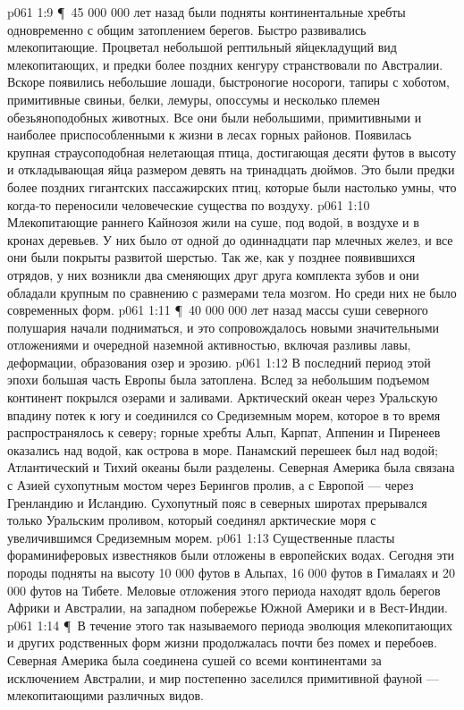 \vs p061 1:9 \P\ 45 000 000 лет назад были подняты континентальные хребты одновременно с общим затоплением берегов. Быстро развивались млекопитающие. Процветал небольшой рептильный яйцекладущий вид млекопитающих, и предки более поздних кенгуру странствовали по Австралии. Вскоре появились небольшие лошади, быстроногие носороги, тапиры с хоботом, примитивные свиньи, белки, лемуры, опоссумы и несколько племен обезьяноподобных животных. Все они были небольшими, примитивными и наиболее приспособленными к жизни в лесах горных районов. Появилась крупная страусоподобная нелетающая птица, достигающая десяти футов в высоту и откладывающая яйца размером девять на тринадцать дюймов. Это были предки более поздних гигантских пассажирских птиц, которые были настолько умны, что когда\hyp{}то переносили человеческие существа по воздуху.
\vs p061 1:10 Млекопитающие раннего Кайнозоя жили на суше, под водой, в воздухе и в кронах деревьев. У них было от одной до одиннадцати пар млечных желез, и все они были покрыты развитой шерстью. Так же, как у позднее появившихся отрядов, у них возникли два сменяющих друг друга комплекта зубов и они обладали крупным по сравнению с размерами тела мозгом. Но среди них не было современных форм.
\vs p061 1:11 \P\ 40 000 000 лет назад массы суши северного полушария начали подниматься, и это сопровождалось новыми значительными отложениями и очередной наземной активностью, включая разливы лавы, деформации, образования озер и эрозию.
\vs p061 1:12 В последний период этой эпохи большая часть Европы была затоплена. Вслед за небольшим подъемом континент покрылся озерами и заливами. Арктический океан через Уральскую впадину потек к югу и соединился со Средиземным морем, которое в то время распространялось к северу; горные хребты Альп, Карпат, Аппенин и Пиренеев оказались над водой, как острова в море. Панамский перешеек был над водой; Атлантический и Тихий океаны были разделены. Северная Америка была связана с Азией сухопутным мостом через Берингов пролив, а с Европой --- через Гренландию и Исландию. Сухопутный пояс в северных широтах прерывался только Уральским проливом, который соединял арктические моря с увеличившимся Средиземным морем.
\vs p061 1:13 Существенные пласты фораминиферовых известняков были отложены в европейских водах. Сегодня эти породы подняты на высоту 10 000 футов в Альпах, 16 000 футов в Гималаях и 20 000 футов на Тибете. Меловые отложения этого периода находят вдоль берегов Африки и Австралии, на западном побережье Южной Америки и в Вест\hyp{}Индии.
\vs p061 1:14 \P\ В течение этого так называемого  периода эволюция млекопитающих и других родственных форм жизни продолжалась почти без помех и перебоев. Северная Америка была соединена сушей со всеми континентами за исключением Австралии, и мир постепенно заселился примитивной фауной --- млекопитающими различных видов.
